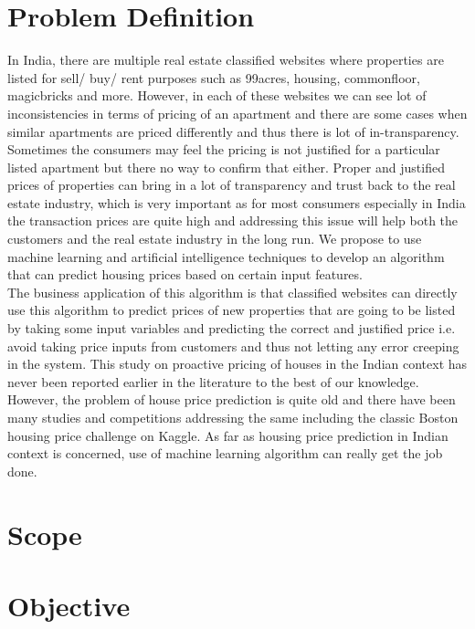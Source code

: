 \section{Problem Definition}
In India, there are multiple real estate classified websites where properties are listed for sell/ buy/ rent purposes such as 99acres, housing, commonfloor, magicbricks and more. However, in each of these websites we can see lot of inconsistencies in terms of pricing of an apartment and there are some cases when similar apartments are priced differently and thus there is lot of in-transparency. Sometimes the consumers may feel the pricing is not justified for a particular listed
apartment but there no way to confirm that either. Proper and justified prices of properties can bring in a lot of transparency and trust back to the real estate industry, which is very important as for most consumers especially in India the transaction prices are quite high and addressing this issue will help both the customers and the real estate industry in the long run. We propose to use machine learning and artificial intelligence techniques to develop an algorithm that can predict housing prices based on certain input features.\\
The business application of this algorithm is that classified websites can directly use this algorithm to predict prices of new properties that are going to be listed by taking some input variables and predicting the correct and justified price i.e. avoid taking price inputs from customers and thus not letting any error creeping in the system. This study on proactive pricing of houses in the Indian context has never been reported earlier in the literature to the best of our knowledge.\\
However, the problem of house price prediction is quite old and there have been many studies and competitions addressing the same including the classic Boston housing price challenge on Kaggle. As far as housing price prediction in Indian context is concerned, use of machine learning algorithm can really get the job done.




\section{Scope}
\section{Objective}

